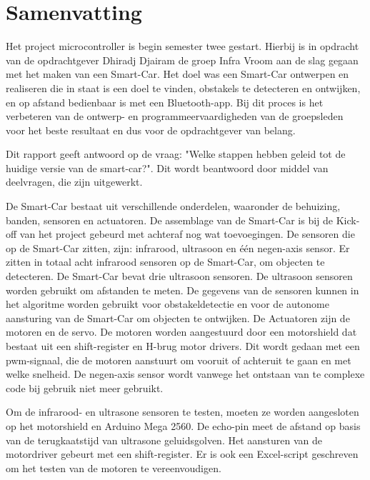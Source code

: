 \section*{Samenvatting}
Het project microcontroller is begin semester twee gestart. Hierbij is in opdracht van de opdrachtgever Dhiradj Djairam de groep Infra Vroom aan de slag gegaan met het maken van een \gls{Smart-Car}. Het doel was een \gls{Smart-Car} ontwerpen en realiseren die in staat is een doel te vinden, obstakels te detecteren en ontwijken, en op afstand bedienbaar is met een \gls{Bluetooth}-app. Bij dit proces is het verbeteren van de ontwerp- en programmeervaardigheden van de groepsleden voor het beste resultaat en dus voor de opdrachtgever van belang.

Dit rapport geeft antwoord op de vraag: "Welke stappen hebben geleid tot de huidige versie van de smart-car?". Dit wordt beantwoord door middel van deelvragen, die zijn uitgewerkt.

De \gls{Smart-Car} bestaat uit verschillende onderdelen, waaronder de behuizing, banden, sensoren en actuatoren. De assemblage van de \gls{Smart-Car} is bij de Kick-off van het project gebeurd met achteraf nog wat toevoegingen. De sensoren die op de \gls{Smart-Car} zitten, zijn: infrarood\cite{IR-datasheet}, ultrasoon en één negen-axis sensor. Er zitten in totaal acht infrarood sensoren op de \gls{Smart-Car}, om objecten te detecteren. De \gls{Smart-Car} bevat drie ultrasoon sensoren. De ultrasoon sensoren worden gebruikt om afstanden te meten. De gegevens van de sensoren kunnen in het algoritme worden gebruikt voor obstakeldetectie en voor de autonome aansturing van de \gls{Smart-Car} om objecten te ontwijken. De Actuatoren zijn de motoren en de servo. De motoren worden aangestuurd door een \gls{motorshield} dat bestaat uit een \gls{shift-register} en \gls{H-brug} motor drivers\cite{h-brug}. Dit wordt gedaan met een pwm-signaal, die de motoren aanstuurt om vooruit of achteruit te gaan en met welke snelheid. De negen-axis sensor wordt vanwege het ontstaan van te complexe code bij gebruik niet meer gebruikt.  

Om de infrarood- en ultrasone sensoren te testen, moeten ze worden aangesloten op het \gls{motorshield} en Arduino Mega 2560\cite{ArduinoMEGA}. De echo-pin meet de afstand op basis van de terugkaatstijd van ultrasone geluidsgolven. Het aansturen van de motordriver\cite{h-brug} gebeurt met een \gls{shift-register}. Er is ook een Excel-script geschreven om het testen van de motoren te vereenvoudigen.

